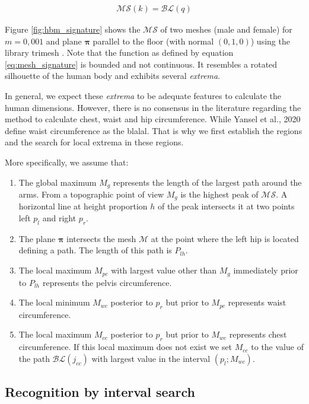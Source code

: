 \documentclass[runningheads, orivec]{llncs}
\begin{document}
\begin{align}\label{eq:mesh_signature}
\mathcal{MS}(k) = \mathcal{BL}(q)
\end{align}

Figure \ref{fig:hbm_signature} shows the $\mathcal{MS}$ of two meshes (male 
and female) for 
$m=0,001$ and plane $\boldsymbol{\pi}$ parallel to the floor (with normal $(0, 
1,0)$) using the library trimesh \cite{trimesh}. Note that the function as 
defined by equation \ref{eq:mesh_signature} is bounded and not continuous. It 
resembles a rotated silhouette of the human body and exhibits several 
\textit{extrema}.

In general, we expect these \textit{extrema} to be adequate features to 
calculate the human dimensions. However, there is no consensus in the 
literature regarding the method to calculate chest, waist and hip 
circumference. While Yansel et al., 2020 define waist circumference as the 
blalal. That is why we first establish the regions and the search for local 
extrema in these regions.

More specifically, we assume that:
\begin{enumerate}
	\item The global maximum $M_g$ represents the length of the largest path 
	around the arms. From a topographic point of view $M_g$ is the highest peak 
	of $\mathcal{MS}$. A horizontal line at height proportion $h$ of the peak 
	intersects 
	it at two points left $p_l$ and right $p_r$.
	\item The plane $\boldsymbol{\pi}$ intersects the mesh $\mathcal{M}$ at the 
	point where the left hip is located defining a path. The length of this 
	path is $P_{lh}$.	
	\item The local maximum $M_{pc}$ with largest value other than $M_g$ 
	immediately prior to $P_{lh}$ represents the pelvis circumference.	
	\item The local minimum $M_{wc}$ posterior to $p_r$ but prior to $M_{pc}$ 
	represents waist circumference.
	\item The local maximum $M_{cc}$ posterior to $p_r$ but prior to $M_{wc}$ 
	represents 
	chest circumference. If this local maximum does not exist we set $M_{cc}$ 
	to the value of the path $\mathcal{BL}(j_{cc})$ with largest value in the 
	interval $(p_l; M_{wc})$.
\end{enumerate}

\subsection{Recognition by interval search}\label{subsec:interval_search}
\end{document}
